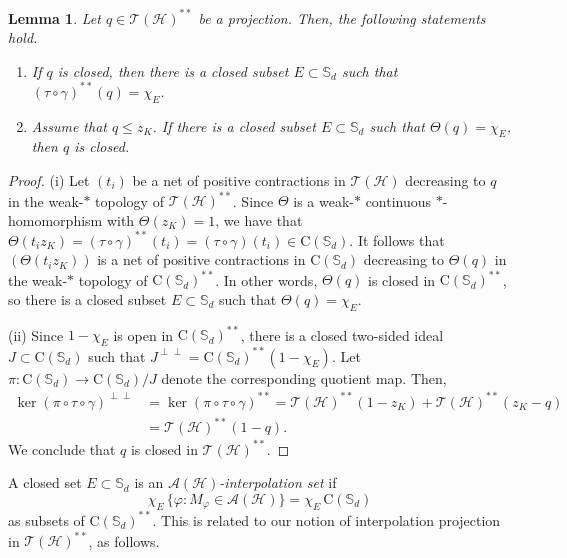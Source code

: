 \documentclass[10pt]{amsart}
\newcommand{\bS}{{\mathbb{S}}}
\newcommand{\A}{{\mathcal{A}}}
\renewcommand{\H}{{\mathcal{H}}}
\newcommand{\T}{{\mathcal{T}}}
\newcommand{\rC}{\mathrm{C}}
\renewcommand{\phi}{\varphi}
\newtheorem{lemma}{Lemma}[section]
\theoremstyle{definition}
\begin{document}
\begin{lemma}\label{L:closedsetproj}
Let $q\in \T(\H)^{**}$ be a projection. Then, the following statements hold.
\begin{enumerate}[{\rm (i)}]
\item 
 If $q$ is closed, then there is a closed subset $E\subset \bS_d$ such that $(\tau\circ \gamma)^{**}(q)=\chi_E$.
\item Assume that $q\leq z_K$. If  there is a closed subset $E\subset \bS_d$ such that $\Theta(q)=\chi_E$, then $q$ is closed.
\end{enumerate}
\end{lemma}
\begin{proof}
(i) Let $(t_i)$ be a net of positive contractions in $\T(\H)$ decreasing to $q$ in the weak-$*$ topology of $\T(\H)^{**}$. Since $\Theta$ is a weak-$*$ continuous $*$-homomorphism 
with $\Theta(z_K) = 1$,  
we have that $\Theta(t_i z_K) = (\tau\circ \gamma)^{**}(t_i) =( \tau\circ \gamma)(t_i) \in \rC(\bS_d)$.
It follows that $(\Theta(t_i z_K) )$ is a  net of positive contractions in $\rC(\bS_d)$ decreasing to $\Theta(q)$ in the weak-$*$ topology of $\rC(\bS_d)^{**}$. In other words, $\Theta(q)$ is closed in $\rC(\bS_d)^{**}$, so  there is a closed subset $E\subset \bS_d$ such that $\Theta(q)=\chi_E$.
 
 
(ii) Since $1-\chi_E$ is open in $\rC(\bS_d)^{**}$, there is a closed two-sided ideal $J\subset \rC(\bS_d)$ such that $J^{\perp\perp}=\rC(\bS_d)^{**}(1-\chi_E)$. Let $\pi:\rC(\bS_d)\to \rC(\bS_d)/J$ denote the corresponding quotient map. 
Then,
\begin{align*}
\ker(\pi\circ \tau\circ \gamma)^{\perp\perp}&=\ker(\pi\circ \tau\circ \gamma)^{**}=\T(\H)^{**}(1-z_K)+\T(\H)^{**}(z_K-q)\\
&=\T(\H)^{**}(1-q).
\end{align*}
We conclude that $q$  is closed in $\T(\H)^{**}$. 
\end{proof}

A closed set $E\subset \bS_d$ is an \emph{$\A(\H)$-interpolation set} if 
\[
\chi_E \, \{\phi:M_\phi\in \A(\H)\} =\chi_E \, \rC(\bS_d) 
\]
as subsets of $\rC(\bS_d)^{**}$. This is related to our notion of interpolation projection in $\T(\H)^{**}$, as follows.
\end{document}
